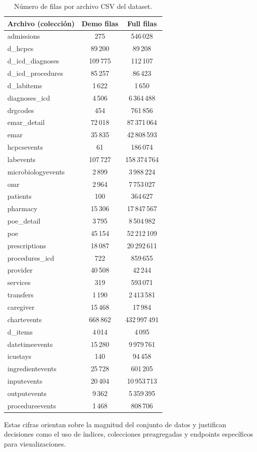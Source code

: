 \begin{table}[H]
  \centering
  \small
  \begin{tabular}{|l|c|c|}
    \hline
    \textbf{Archivo (colección)} & \textbf{Demo filas} & \textbf{Full filas} \\
    \hline
    admissions & 275 & 546\,028 \\
    d\_hcpcs & 89\,200 & 89\,208 \\
    d\_icd\_diagnoses & 109\,775 & 112\,107 \\
    d\_icd\_procedures & 85\,257 & 86\,423 \\
    d\_labitems & 1\,622 & 1\,650 \\
    diagnoses\_icd & 4\,506 & 6\,364\,488 \\
    drgcodes & 454 & 761\,856 \\
    emar\_detail & 72\,018 & 87\,371\,064 \\
    emar & 35\,835 & 42\,808\,593 \\
    hcpcsevents & 61 & 186\,074 \\
    labevents & 107\,727 & 158\,374\,764 \\
    microbiologyevents & 2\,899 & 3\,988\,224 \\
    omr & 2\,964 & 7\,753\,027 \\
    patients & 100 & 364\,627 \\
    pharmacy & 15\,306 & 17\,847\,567 \\
    poe\_detail & 3\,795 & 8\,504\,982 \\
    poe & 45\,154 & 52\,212\,109 \\
    prescriptions & 18\,087 & 20\,292\,611 \\
    procedures\_icd & 722 & 859\,655 \\
    provider & 40\,508 & 42\,244 \\
    services & 319 & 593\,071 \\
    transfers & 1\,190 & 2\,413\,581 \\
    caregiver & 15\,468 & 17\,984 \\
    chartevents & 668\,862 & 432\,997\,491 \\
    d\_items & 4\,014 & 4\,095 \\
    datetimeevents & 15\,280 & 9\,979\,761 \\
    icustays & 140 & 94\,458 \\
    ingredientevents & 25\,728 & 601\,205 \\
    inputevents & 20\,404 & 10\,953\,713 \\
    outputevents & 9\,362 & 5\,359\,395 \\
    procedureevents & 1\,468 & 808\,706 \\
    \hline
  \end{tabular}
  \caption{Número de filas por archivo CSV del dataset.}
  \label{tab:estadisticas_basicas}
\end{table}

Estas cifras orientan sobre la magnitud del conjunto de datos y justifican decisiones como el uso de índices, colecciones preagregadas y endpoints específicos para visualizaciones.

